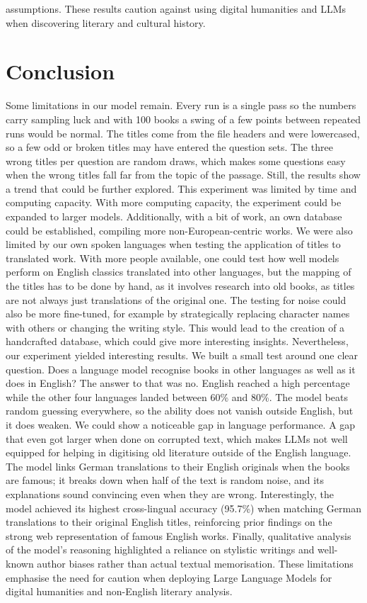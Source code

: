 \documentclass[11pt]{article}
\begin{document}
assumptions. These results caution against using digital humanities and LLMs when discovering literary and cultural history. 


\section{Conclusion}
Some limitations in our model remain. Every run is a single pass so the numbers carry sampling luck and with 100 books a swing of a few points between repeated runs would be normal. The titles come from the file headers and were lowercased, so a few odd or broken titles may have entered the question sets. The three wrong titles per question are random draws, which makes some questions easy when the wrong titles fall far from the topic of the passage. Still, the results show a trend that could be further explored. This experiment was limited by time and computing capacity. With more computing capacity, the experiment could be expanded to larger models. Additionally, with a bit of work, an own database could be established, compiling more non-European-centric works. We were also limited by our own spoken languages when testing the application of titles to translated work. With more people available, one could test how well models perform on English classics translated into other languages, but the mapping of the titles has to be done by hand, as it involves research into old books, as titles are not always just translations of the original one. The testing for noise could also be more fine-tuned, for example by strategically replacing character names with others or changing the writing style. This would lead to the creation of a handcrafted database, which could give more interesting insights. 
Nevertheless, our experiment yielded interesting results. We built a small test around one clear question. Does a language model recognise books in other languages as well as it does in English? 
The answer to that was no. English reached a high percentage while the other four languages landed between 60\% and 80\%. The model beats random guessing everywhere, so the ability does not vanish outside English, but it does weaken. We could show a noticeable gap in language performance. A gap that even got larger when done on corrupted text, which makes LLMs not well equipped for helping in digitising old literature outside of the English language. The model links German translations
to their English originals when the books are famous; it breaks down when half
of the text is random noise, and its explanations sound convincing even when
they are wrong. Interestingly, the model achieved its highest cross-lingual accuracy (95.7\%) when matching German translations to their original English titles, reinforcing prior findings on the strong web representation of famous English works. Finally, qualitative analysis of the model’s reasoning highlighted a reliance on stylistic writings and well-known author biases rather than actual textual memorisation. These limitations emphasise the need for caution when deploying Large Language Models for digital humanities and non-English literary analysis. 
\end{document}
